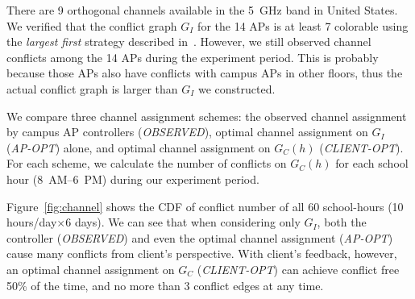There are 9 orthogonal channels available in the 5~GHz band in United States. We
verified that the conflict graph $G_I$ for the 14 APs is at least 7 colorable
using the \textit{largest first} strategy described
in~\cite{kosowski2004classical}.  However, we still observed channel conflicts
among the 14 APs during the experiment period. This is probably because those APs
also have conflicts with campus APs in other floors, thus the actual conflict
graph is larger than $G_I$ we constructed.

We compare three channel assignment schemes: the observed channel assignment by
campus AP controllers (\textit{OBSERVED}), optimal channel assignment on $G_I$
(\textit{AP-OPT}) alone, and optimal channel assignment on $G_C(h)$
(\textit{CLIENT-OPT}). For each scheme, we calculate the number of conflicts on
$G_C(h)$ for each school hour (8~AM--6~PM) during our experiment period.

Figure~\ref{fig:channel} shows the CDF of conflict number of all 60 school-hours
(10 hours/day$\times$6 days). We can see that when considering only $G_I$, both the
controller (\textit{OBSERVED}) and even the optimal channel assignment
(\textit{AP-OPT}) cause many conflicts from client's perspective. With client's
feedback, however, an optimal channel assignment on $G_C$ (\textit{CLIENT-OPT})
can achieve conflict free 50\% of the time, and no more than 3 conflict edges
at any time.

